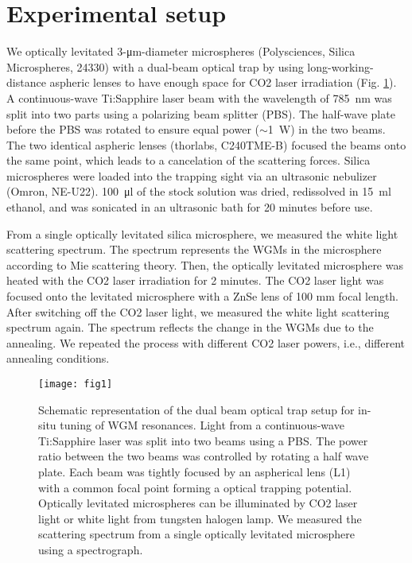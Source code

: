 \documentclass[aps,prl,preprint,groupedaddress]{revtex4-1}
\begin{document}
\section{Experimental setup}
\label{sec:setup}

We optically levitated 3-\si{\micro \meter}-diameter microspheres (Polysciences, Silica Microspheres, 24330) with a dual-beam optical trap by using long-working-distance aspheric lenses to have enough space for CO2 laser irradiation (Fig. \ref{fig:schematic}). A continuous-wave Ti:Sapphire laser beam with the wavelength of \SI{785}{nm} was split into two parts using a polarizing beam splitter (PBS). The half-wave plate before the PBS was rotated to ensure equal power ($\sim$\SI{1}{W}) in the two beams. The two identical aspheric lenses (thorlabs, C240TME-B) focused the beams onto the same point, which leads to a cancelation of the scattering forces\cite{li_millikelvin_2011}. Silica microspheres were loaded into the trapping sight via an ultrasonic nebulizer (Omron, NE-U22)\cite{neukirch_observation_2013,monteiro_dynamics_2013,minowa_optical_2015}. \SI{100}{\micro\litre} of the stock solution was dried, redissolved in \SI{15}{\milli \litre} ethanol, and was sonicated in an ultrasonic bath for 20 minutes before use.

From a single optically levitated silica microsphere, we measured the white light scattering spectrum. The spectrum represents the WGMs in the microsphere according to Mie scattering theory\cite{bohren_absorption_1983,schietinger_coupling_2009}. Then, the optically levitated microsphere was heated with the CO2 laser irradiation for 2 minutes. The CO2 laser light was focused onto the levitated microsphere with a ZnSe lens of 100 mm focal length. After switching off the CO2 laser light, we measured the white light scattering spectrum again. The spectrum reflects the change in the WGMs due to the annealing. We repeated the process with different CO2 laser powers, i.e., different annealing conditions.   

\begin{figure}[htbp]
\centering
\texttt{[image: fig1]}
\caption{Schematic representation of the dual beam optical trap setup for in-situ tuning of WGM resonances. Light from a continuous-wave Ti:Sapphire laser was split into two beams using a PBS. The power ratio between the two beams was controlled by rotating a half wave plate. Each beam was tightly focused by an aspherical lens (L1) with a common focal point forming a optical trapping potential. Optically levitated microspheres can be illuminated by CO2 laser light or white light from tungsten halogen lamp. We measured the scattering spectrum from a single optically levitated microsphere using a spectrograph.}
\label{fig:schematic}
\end{figure}
\end{document}
